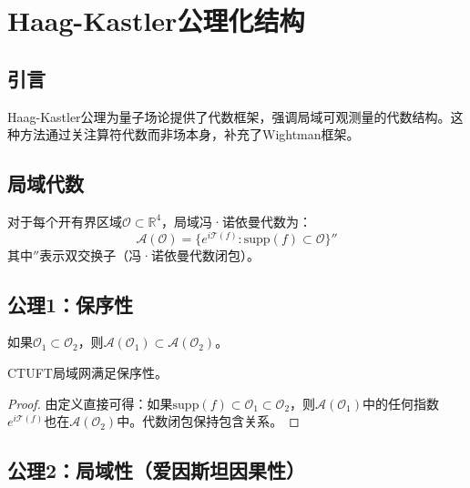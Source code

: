 \section{Haag-Kastler公理化结构}
\label{sec:haag_kastler}

\subsection{引言}

Haag-Kastler公理\cite{haag1964}为量子场论提供了代数框架，强调局域可观测量的代数结构。这种方法通过关注算符代数而非场本身，补充了Wightman框架。

\subsection{局域代数}

\begin{definition}[局域代数]
对于每个开有界区域$\mathcal{O} \subset \mathbb{R}^4$，局域冯·诺依曼代数为：
\begin{equation}
    \mathcal{A}(\mathcal{O}) = \{ e^{i\mathcal{T}(f)} : \text{supp}(f) \subset \mathcal{O} \}''
\end{equation}
其中$''$表示双交换子（冯·诺依曼代数闭包）。
\end{definition}

\subsection{公理1：保序性}

\begin{axiom}[保序性]
如果$\mathcal{O}_1 \subset \mathcal{O}_2$，则$\mathcal{A}(\mathcal{O}_1) \subset \mathcal{A}(\mathcal{O}_2)$。
\end{axiom}

\begin{theorem}[保序性验证]
CTUFT局域网满足保序性。
\end{theorem}

\begin{proof}
由定义直接可得：如果$\text{supp}(f) \subset \mathcal{O}_1 \subset \mathcal{O}_2$，则$\mathcal{A}(\mathcal{O}_1)$中的任何指数$e^{i\mathcal{T}(f)}$也在$\mathcal{A}(\mathcal{O}_2)$中。代数闭包保持包含关系。
\end{proof}

\subsection{公理2：局域性（爱因斯坦因果性）}

